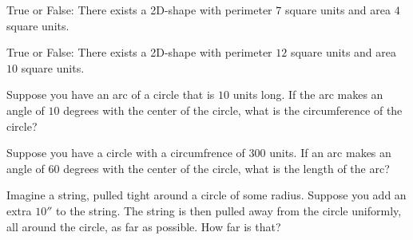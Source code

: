 \documentclass[noauthor,nooutcomes]{ximera}
\author{Bart Snapp}
\begin{document}
\maketitle




\begin{exercise} %
 True or False: There exists a 2D-shape with perimeter $7$ square units
 and area $4$ square units.
\end{exercise}

\begin{exercise} %
  True or False: There exists a 2D-shape with perimeter $12$ square units
  and area $10$ square units.
\end{exercise}

    

   

\begin{exercise}
 Suppose you have an arc of a circle that is $10$ units long. If the
 arc makes an angle of $10$ degrees with the center of the circle,
 what is the circumference of the circle?
\end{exercise}



\begin{exercise}
 Suppose you have a circle with a circumfrence of $300$ units. If an
 arc makes an angle of $60$ degrees with the center of the circle,
 what is the length of the arc?
\end{exercise}





\begin{exercise}
Imagine a string, pulled tight around a circle of some radius. Suppose
you add an extra $10''$ to the string. The string is then pulled away
from the circle uniformly, all around the circle, as far as
possible. How far is that?
\end{exercise}


\end{document}
